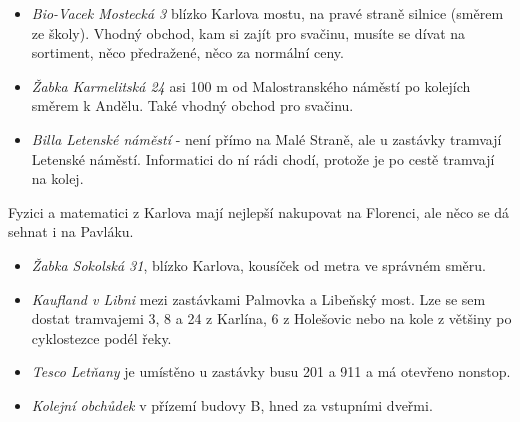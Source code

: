 \begin{itemize}
\item \textit{Bio-Vacek Mostecká 3} blízko Karlova mostu, na pravé straně
silnice (směrem ze školy). Vhodný obchod, kam si zajít pro svačinu, musíte se
dívat na sortiment, něco předražené, něco za normální ceny.
\item \textit{Žabka Karmelitská 24} asi 100 m od Malostranského náměstí po
kolejích směrem k Andělu. Také vhodný obchod pro svačinu.
\item \textit{Billa Letenské náměstí} - není přímo na Malé Straně, ale u
zastávky tramvají Letenské náměstí. Informatici do ní rádi chodí, protože je po
cestě tramvají na kolej.
\end{itemize}

Fyzici a matematici z Karlova mají nejlepší nakupovat na Florenci, ale něco se
dá sehnat i na Pavláku.
\begin{itemize}
\item \textit{Žabka Sokolská 31}, blízko Karlova, kousíček od metra ve správném
směru.
\end{itemize}

\begin{itemize}
\item \textit{Kaufland v Libni} mezi zastávkami Palmovka a Libeňský most. Lze se
sem dostat tramvajemi 3, 8 a 24 z Karlína, 6 z Holešovic nebo na kole z většiny
po cyklostezce podél řeky.
\item \textit{Tesco Letňany} je umístěno u zastávky busu 201 a 911 a má otevřeno
nonstop.
\item \textit{Kolejní obchůdek} v přízemí budovy B, hned za vstupními dveřmi.
\end{itemize}

